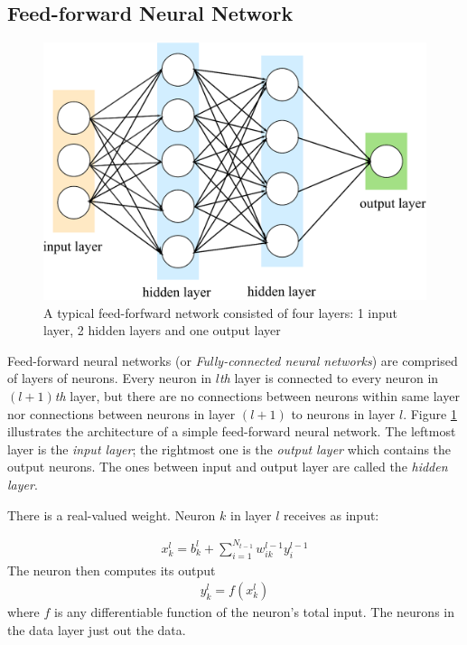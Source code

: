 \subsection{Feed-forward Neural Network}
\begin{figure}
	\centering
	\includegraphics[width=0.75\linewidth]{Chapters/Fig/feedforward.eps}
	\caption[A typical feed-forfward network]{A typical feed-forfward network consisted of four layers: 1 input layer, 2 hidden layers and one output layer}
	\label{fig:ff-net}
\end{figure}
Feed-forward neural networks (or \textit{Fully-connected neural networks}) are comprised of layers of neurons. Every neuron in $l$\textit{th} layer is connected to every neuron in $\left(l+1\right)$\textit{th} layer, but there are no connections between neurons within same layer nor connections between neurons in layer $\left(l+1\right)$ to neurons in layer $l$. Figure \ref{fig:ff-net} illustrates the architecture of a simple feed-forward neural network. The leftmost layer is the \textit{input layer}; the rightmost one is the \textit{output layer} which contains the output neurons. The ones between input and output layer are called the \textit{hidden layer}.

 There is a real-valued weight. Neuron $k$ in layer $l$ receives as input:

\begin{align*}
	x^l_k = b^l_k + \sum^{N_{t-1}}_{i=1} w^{l-1}_{ik}y^{l-1}_i
\end{align*}
The neuron then computes its output
\begin{align*}
y^l_k = f\left(x^l_k\right)
\end{align*}
where $f$ is any differentiable function of the neuron's total input. The neurons in the data layer just out the data.

